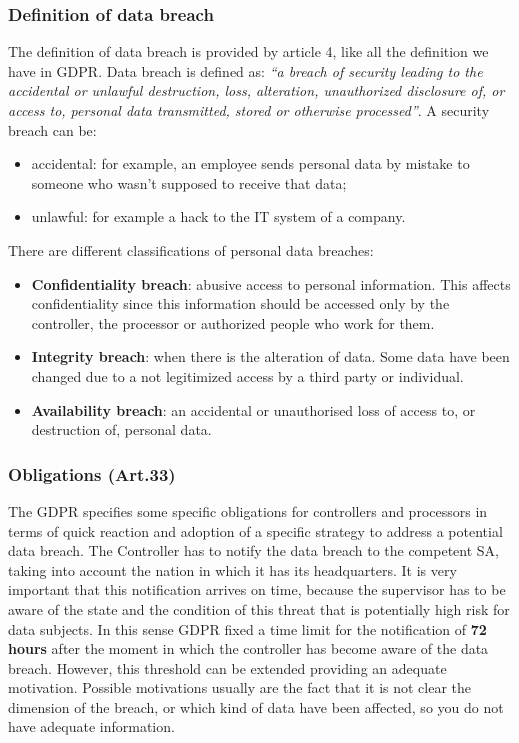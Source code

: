 \subsubsection{Definition of data breach}
The definition of data breach is provided by article 4, like all the definition we have in GDPR. Data breach is defined as: \textit{“a breach of security leading to the accidental or unlawful destruction, loss, alteration, unauthorized disclosure of, or access to, personal data transmitted, stored or otherwise processed”}. A security breach can be:
\begin{itemize}
    \item accidental: for example, an employee sends personal data by mistake to someone who wasn't supposed to receive that data;
    \item unlawful: for example a hack to the IT system of a company.
\end{itemize}
There are different classifications of personal data breaches:
\begin{itemize}
    \item \textbf{Confidentiality breach}: abusive access to personal information. This affects confidentiality since this information should be accessed only by the controller, the processor or authorized people who work for them.
    \item \textbf{Integrity breach}: when there is the alteration of data. Some data have been changed due to a not legitimized access by a third party or individual.
    \item \textbf{Availability breach}: an accidental or unauthorised loss of access to, or destruction of, personal data.
\end{itemize}
\subsubsection{Obligations (Art.33)}
The GDPR specifies some specific obligations for controllers and processors in terms of quick reaction and adoption of a specific strategy to address a potential data breach. 
The Controller has to notify the data breach to the competent SA, taking into account the nation in which it has its headquarters. It is very important that this notification arrives on time, because the supervisor has to be aware of the state and the condition of this threat that is potentially high risk for data subjects. In this sense GDPR fixed a time limit for the notification of \textbf{72 hours} after the moment in which the controller has become aware of the data breach. However, this threshold can be extended providing an adequate motivation. Possible motivations usually are the fact that it is not clear the dimension of the breach, or which kind of data have been affected, so you do not have adequate information. 

